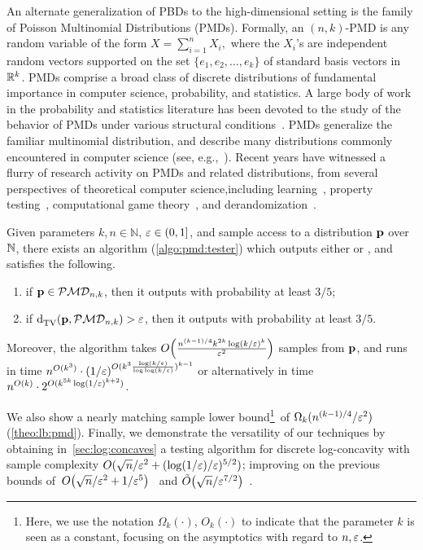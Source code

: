 An alternate generalization of PBDs to the high-dimensional setting is the family of
Poisson Multinomial Distributions (PMDs).
Formally, an $(n, k)$-PMD is any random variable of the form $X = \sum_{i=1}^n X_i,$
where the $X_i$'s are independent random vectors supported on the set
$\{e_1, e_2, \ldots, e_k \}$ of standard basis vectors in $\R^k$.
PMDs comprise a broad class of discrete distributions of fundamental importance in computer science, probability, and statistics.
A large body of work in the probability and statistics literature has been devoted to the study of the behavior
of PMDs under various structural conditions~\cite{Barbour88, Loh92, BHJ:92, Bentkus:03, Roos99, Roos10}.
PMDs generalize the familiar multinomial distribution, and describe many distributions commonly encountered in computer science (see, e.g.,~\cite{DaskalakisP07, DaskalakisP08, Valiant:11, VV:11:stoc}).
Recent years have witnessed a flurry of research activity on PMDs and related distributions,
from several perspectives of theoretical computer science,including learning~\cite{DDS:PBD:15, DDOST:13, DKS:15, DKT:15, DKS:15b}, property testing~\cite{Valiant:11, ValiantValiant:10lb, VV:11:stoc}, 
 computational game theory~\cite{DaskalakisP07, DaskalakisP08, BorgsCIKMP08, DaskalakisP09, DaskalakisP2014, GT14,CDS:17},
 and derandomization~\cite{GMRZ:11, BDS:12, De:15, GKM:15}. 


\begin{theorem}\label{theo:testing:pmd}
    Given parameters $k,n\in\mathbb{N}$, $\eps\in(0,1]$, and sample access to a distribution $\p$ over $\N$, there exists an algorithm (\cref{algo:pmd:tester}) which outputs either \accept or \reject, and satisfies the following.
    \begin{enumerate}
        \item if $\p \in \classpmd[n]{k}$, then it outputs \accept with probability at least $3/5$;
        \item if $\totalvardist{\p}{\classpmd[n]{k}} > \eps$, then it outputs \reject with probability at least $3/5$.
    \end{enumerate}
    Moreover, the algorithm takes $\bigO{\frac{n^{(k-1)/4} k^{2k} \log(k/\eps)^k}{\eps^2}}$ samples from $\p$, 
    and runs in time $n^{O(k^3)} \cdot (1/\eps)^{O(k^3\frac{\log(k/\eps)}{\log\log(k/\eps)})^{k-1}}$ or alternatively in time $n^{O(k)} \cdot  2^{O(k^{5k} \log(1/\eps)^{k+2})}$.
\end{theorem}
We also show a nearly matching sample lower bound\footnote{Here, we use the notation $\Omega_k(\cdot)$, $O_k(\cdot)$ to indicate that the parameter $k$ is seen as a constant, focusing on the asymptotics with regard to $n,\eps$.}\ of $\Omega_k( n^{{(k-1)}/{4}}/\eps^2 )$ (\cref{theo:lb:pmd}). Finally, we demonstrate the versatility of our techniques by obtaining in~\cref{sec:log:concaves} a testing algorithm for discrete log-concavity with sample complexity $O(\sqrt{n}/\eps^2 + (\log(1/\eps)/\eps)^{5/2})$; improving on the previous bounds of~$\bigO{{\sqrt{n}}/{\eps^{2}}+{1}/{\eps^5}}$~\cite{ADK:15} and $\tildeO{{\sqrt{n}}/{\eps^{7/2}}}$~\cite{CDGR:16}.


